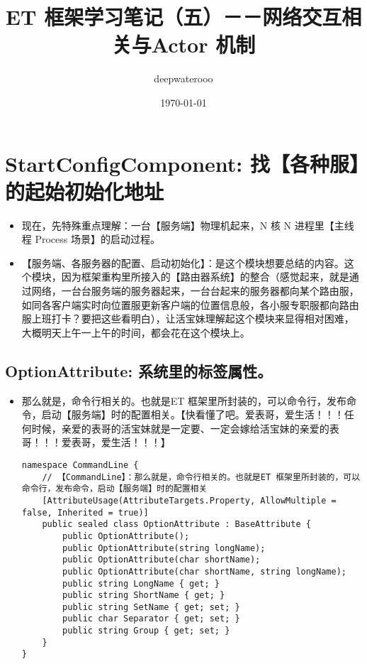 \documentclass[9pt, b5paper]{article}
\author{deepwaterooo}
\date{\today}
\title{ET 框架学习笔记（五）－－网络交互相关与Actor 机制}
\begin{document}
\maketitle
\tableofcontents

\section{StartConfigComponent: 找【各种服】的起始初始化地址}
\label{sec-1}
\begin{itemize}
\item 现在，先特殊重点理解：一台【服务端】物理机起来，N 核 N 进程里【主线程 Process 场景】的启动过程。
\item 【服务端、各服务器的配置、启动初始化】：是这个模块想要总结的内容。这个模块，因为框架重构里所接入的【路由器系统】的整合（感觉起来，就是通过网络，一台台服务端的服务器起来，一台台起来的服务器都向某个路由服，如同各客户端实时向位置服更新客户端的位置信息般，各小服专职服都向路由服上班打卡？要把这些看明白），让活宝妹理解起这个模块来显得相对困难，大概明天上午一上午的时间，都会花在这个模块上。
\end{itemize}
\subsection{OptionAttribute: 系统里的标签属性。}
\label{sec-1-1}
\begin{itemize}
\item 那么就是，命令行相关的。也就是ET 框架里所封装的，可以命令行，发布命令，启动【服务端】时的配置相关。【快看懂了吧。爱表哥，爱生活！！！任何时候，亲爱的表哥的活宝妹就是一定要、一定会嫁给活宝妹的亲爱的表哥！！！爱表哥，爱生活！！！】
\begin{verbatim}
namespace CommandLine {
    // 【CommandLine】：那么就是，命令行相关的。也就是ET 框架里所封装的，可以命令行，发布命令，启动【服务端】时的配置相关
    [AttributeUsage(AttributeTargets.Property, AllowMultiple = false, Inherited = true)]
    public sealed class OptionAttribute : BaseAttribute {
        public OptionAttribute();
        public OptionAttribute(string longName);
        public OptionAttribute(char shortName);
        public OptionAttribute(char shortName, string longName);
        public string LongName { get; }
        public string ShortName { get; }
        public string SetName { get; set; }
        public char Separator { get; set; }
        public string Group { get; set; }
    }
}
\end{verbatim}
\end{itemize}
\end{document}
